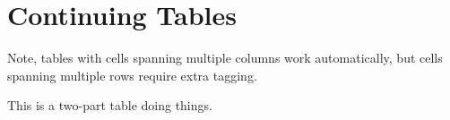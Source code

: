 \section{Continuing Tables}
Note, tables with cells spanning multiple columns work automatically, but cells spanning multiple rows require extra tagging.
\begin{table}[ht]
    \caption{This is a two-part table doing things.}


\end{table}
